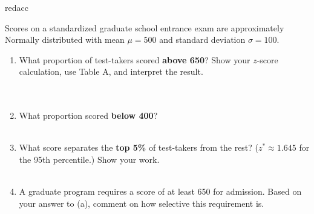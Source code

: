\documentclass[10pt]{article}
\begin{document}
\begin{blurbbox}{redacc}
\small

Scores on a standardized graduate school entrance exam are approximately Normally
distributed with mean $\mu = 500$ and standard deviation $\sigma = 100$.

\vspace{0.08in}

\begin{enumerate}[leftmargin=1.5em, itemsep=8pt]

  \item What proportion of test-takers scored \textbf{above 650}?
        Show your $z$-score calculation, use Table A, and interpret the result.\\[5pt]
        \writeline\\[1pt]\writeline\\[1pt]\writeline

  \item What proportion scored \textbf{below 400}?\\[5pt]
        \writeline\\[1pt]\writeline

  \item What score separates the \textbf{top 5\%} of test-takers from the rest?
        ($z^* \approx 1.645$ for the 95th percentile.) Show your work.\\[5pt]
        \writeline\\[1pt]\writeline

  \item A graduate program requires a score of at least 650 for admission.
        Based on your answer to (a), comment on how selective this requirement is.\\[5pt]
        \writeline\\[1pt]\writeline

\end{enumerate}

\end{blurbbox}
\end{document}
